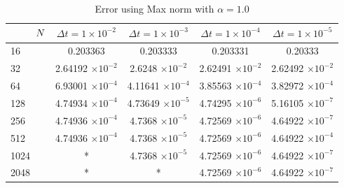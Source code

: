 \begin{table}[H]
\begin{tabular}{lcccc}
			$\hspace{9mm}N$ & $\Delta t=1\times 10^{-2}$ & $\Delta t=1\times 10^{-3}$ & $\Delta t=1\times 10^{-4}$ & $\Delta t=1\times 10^{-5}$ \\
			\midrule
			\hspace{7mm} 16 & 0.203363    & 0.203333    & 0.203331    & 0.20333     \\
			\midrule
			\hspace{7mm} 32 & 2.64192 $\times 10 ^{-2}$   & 2.6248 $\times 10 ^{-2}$    & 2.62491 $\times 10 ^{-2}$  & 2.62492 $\times 10 ^{-2}$   \\
			\midrule
			\hspace{7mm} 64 & 6.93001 $\times 10 ^{-4}$ & 4.11641 $\times 10 ^{-4}$ & 3.85563 $\times 10 ^{-4}$ & 3.82972 $\times 10 ^{-4}$ \\
			\midrule
			\hspace{7mm} 128 & 4.74934 $\times 10 ^{-4}$ & 4.73649 $\times 10 ^{-5}$ & 4.74295 $\times 10 ^{-6}$ & 5.16105 $\times 10 ^{-7}$ \\
			\midrule
			\hspace{7mm} 256 & 4.74936 $\times 10 ^{-4}$ & 4.7368 $\times 10 ^{-5}$  & 4.72569 $\times 10 ^{-6}$ & 4.64922 $\times 10 ^{-7}$ \\
			\midrule
			\hspace{7mm} 512 & 4.74936 $\times 10 ^{-4}$ & 4.7368 $\times 10 ^{-5}$  & 4.72569 $\times 10 ^{-6}$ & 4.64922 $\times 10 ^{-4}$ \\
			\midrule
			\hspace{7mm} 1024 & * & 4.7368 $\times 10 ^{-5}$  & 4.72569 $\times 10 ^{-6}$ & 4.64922 $\times 10 ^{-7}$ \\
			\midrule
			\hspace{7mm} 2048 & * & * & 4.72569 $\times 10 ^{-6}$ & 4.64922 $\times 10 ^{-7}$ \\
			\bottomrule
		\end{tabular}
		\caption{Error using Max norm with $\alpha = 1.0$}
		\label{Galerkin_tabla_max_alpha=1}
	\end{table}

